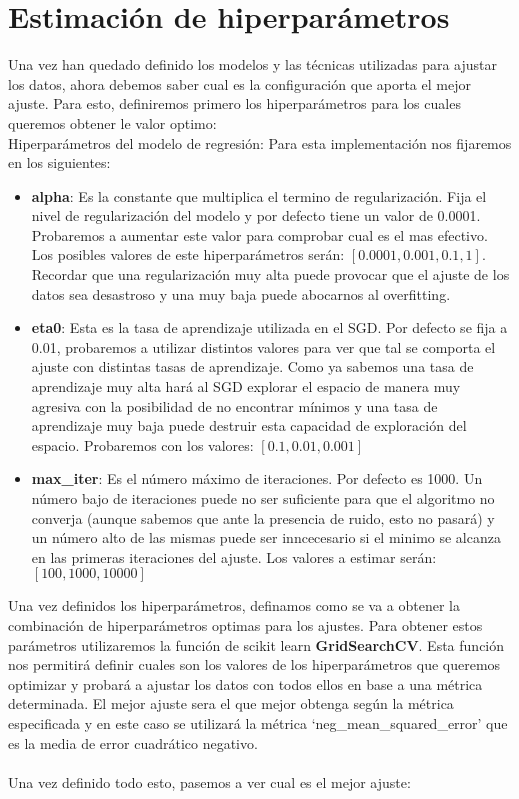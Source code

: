 \section{Estimación de hiperparámetros}
Una vez han quedado definido los modelos y las técnicas utilizadas para ajustar los datos, ahora debemos saber cual es la configuración que aporta el mejor ajuste. Para esto, definiremos primero los hiperparámetros para los cuales queremos obtener le valor optimo:
\\
Hiperparámetros del modelo de regresión: Para esta implementación nos fijaremos en los siguientes\cite{SGDRegressor}:
   \begin{itemize}
      \item \textbf{alpha}: Es la constante que multiplica el termino de regularización. Fija el nivel de regularización del modelo y por defecto tiene un valor de 0.0001. Probaremos a aumentar este valor para comprobar cual es el mas efectivo. Los posibles valores de este hiperparámetros serán: $[0.0001, 0.001, 0.1, 1]$. Recordar que una regularización muy alta puede provocar que el ajuste de los datos sea desastroso y una muy baja puede abocarnos al overfitting.
      \item \textbf{eta0}: Esta es la tasa de aprendizaje utilizada en el SGD. Por defecto se fija a 0.01, probaremos a utilizar distintos valores para ver que tal se comporta el ajuste con distintas tasas de aprendizaje. Como ya sabemos una tasa de aprendizaje muy alta hará al SGD explorar el espacio de manera muy agresiva con la posibilidad de no encontrar mínimos y una tasa de aprendizaje muy baja puede destruir esta capacidad de exploración del espacio. Probaremos con los valores: $[0.1, 0.01, 0.001]$
      \item \textbf{max\_iter}: Es el número máximo de iteraciones. Por defecto es 1000. Un número bajo de iteraciones puede no ser suficiente para que el algoritmo no converja (aunque sabemos que ante la presencia de ruido, esto no pasará) y un número alto de las mismas puede ser inncecesario si el minimo se alcanza en las primeras iteraciones del ajuste. Los valores a estimar serán: $[100, 1000, 10000]$
   \end{itemize}

Una vez definidos los hiperparámetros, definamos como se va a obtener la combinación de hiperparámetros optimas para los ajustes. Para obtener estos parámetros utilizaremos la función de scikit learn \textbf{GridSearchCV}\cite{GridSearchCV}. Esta función nos permitirá definir cuales son los valores de los hiperparámetros que queremos optimizar y probará a ajustar los datos con todos ellos en base a una métrica determinada. El mejor ajuste sera el que mejor obtenga según la métrica especificada y en este caso se utilizará la métrica `neg\_mean\_squared\_error'\cite{MSE} que es la media de error cuadrático negativo.
\\\\
Una vez definido todo esto, pasemos a ver cual es el mejor ajuste:

